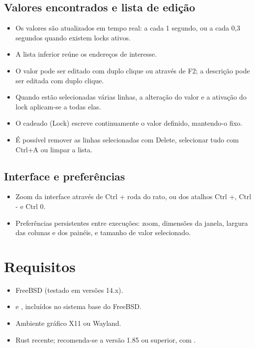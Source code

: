 \documentclass[11pt,a4paper]{article}
\newcommand{\cmd}[1]{\texttt{\detokenize{#1}}}
\newcommand{\key}[1]{\textsf{#1}}
\begin{document}
\subsection{Valores encontrados e lista de edição}
\begin{itemize}
  \item Os valores são atualizados em tempo real: a cada 1 segundo, ou a cada 0,3 segundos quando existem locks ativos.
  \item A lista inferior reúne os endereços de interesse.
  \item O valor pode ser editado com duplo clique ou através de \key{F2}; a descrição pode ser editada com duplo clique.
  \item Quando estão selecionadas várias linhas, a alteração do valor e a ativação do lock aplicam-se a todas elas.
  \item O cadeado (\key{Lock}) escreve continuamente o valor definido, mantendo-o fixo.
  \item É possível remover as linhas selecionadas com \key{Delete}, selecionar tudo com \key{Ctrl+A} ou limpar a lista.
\end{itemize}

\subsection{Interface e preferências}
\begin{itemize}
  \item Zoom da interface através de \key{Ctrl} + roda do rato, ou dos atalhos \key{Ctrl +}, \key{Ctrl -} e \key{Ctrl 0}.
  \item Preferências persistentes entre execuções: zoom, dimensões da janela, largura das colunas e dos painéis, e tamanho de valor selecionado.
\end{itemize}

\section{Requisitos}
\begin{itemize}
  \item FreeBSD (testado em versões 14.x).
  \item \cmd{ps} e \cmd{procstat}, incluídos no sistema base do FreeBSD.
  \item Ambiente gráfico X11 ou Wayland.
  \item Rust recente; recomenda-se a versão 1.85 ou superior, com \cmd{cargo}.
\end{itemize}
\end{document}
